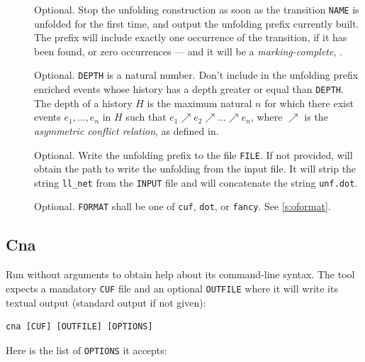 \documentclass[a4paper]{refart}
\begin{document}
\begin{description}
\item[]
  Optional.  Stop the unfolding construction as soon as the transition
  \verb!NAME! is unfolded for the first time, and output the unfolding
  prefix currently built.  The prefix will include exactly one occurrence
  of the transition, if it has been found, or zero occurrences ---
  and it will be a \emph{marking-complete}, \cf \cite{BBCKRS12}.

\item[]
  Optional. \verb!DEPTH! is a natural number.
  Don't include in the unfolding prefix enriched events whose
  history has a depth greater or equal than \verb!DEPTH!.  The depth of a
  history $H$ is the maximum natural $n$ for which there exist events
  $e_1, \ldots, e_n$ in $H$
  such that $e_1 \nearrow e_2 \nearrow \ldots \nearrow e_n$,
  where $\nearrow$ is the \emph{asymmetric conflict relation}, as
  defined in\cite{BBCKRS12}.

\item[]
  Optional.  Write the unfolding prefix to the file \verb!FILE!.
  If not provided, \cunf will obtain the path to write the unfolding from
  the input file.  It will strip the string \verb!ll_net! from the
  \verb!INPUT! file and will concatenate the string \verb!unf.dot!.

\item[]
  Optional. \verb!FORMAT! shall be one of
  \verb!cuf!,
  \verb!dot!, or
  \verb!fancy!.
  See \cref{s:oformat}.
\end{description}

\subsection{Cna{}}%
\label{s:cna}

Run \cna without arguments to obtain help about its command-line syntax.
The tool expects a mandatory \verb!CUF! file and an optional
\verb!OUTFILE! where it will write its textual output (standard output if
not given):

\begin{verbatim}
cna [CUF] [OUTFILE] [OPTIONS]
\end{verbatim}

Here is the list of \verb!OPTIONS! it accepts:
\end{document}
